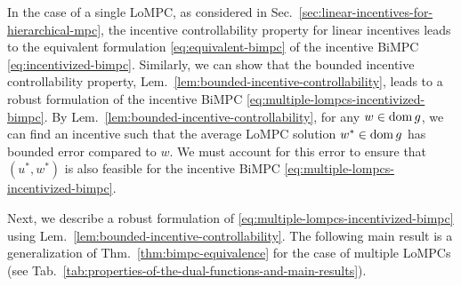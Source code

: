 
In the case of a single LoMPC, as considered in Sec.~\ref{sec:linear-incentives-for-hierarchical-mpc}, the incentive controllability property for linear incentives leads to the equivalent formulation \eqref{eq:equivalent-bimpc} of the incentive BiMPC \eqref{eq:incentivized-bimpc}.
Similarly, we can show that the bounded incentive controllability property, Lem.~\ref{lem:bounded-incentive-controllability}, leads to a robust formulation of the incentive BiMPC \eqref{eq:multiple-lompcs-incentivized-bimpc}.
By Lem.~\ref{lem:bounded-incentive-controllability}, for any $w \in \operatorname{dom}{g}$, we can find an incentive such that the average LoMPC solution $w^* \in \operatorname{dom}{g}$ has bounded error compared to $w$.
We must account for this error to ensure that $(u^*, w^*)$ is also feasible for the incentive BiMPC \eqref{eq:multiple-lompcs-incentivized-bimpc}.

Next, we describe a robust formulation of \eqref{eq:multiple-lompcs-incentivized-bimpc} using Lem.~\ref{lem:bounded-incentive-controllability}.
The following main result is a generalization of Thm.~\ref{thm:bimpc-equivalence} for the case of multiple LoMPCs (see Tab.~\ref{tab:properties-of-the-dual-functions-and-main-results}).

